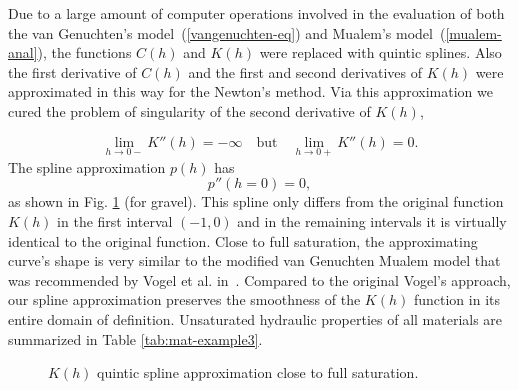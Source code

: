 \documentclass[final,3p,times,twocolumn]{elsarticle}
\begin{document}
Due to a large amount of computer operations involved in the evaluation of both 
the van Genuchten's model~(\ref{vangenuchten-eq}) and Mualem's model~(\ref{mualem-anal}), 
the functions $C(h)$ and $K(h)$ were replaced with quintic splines. Also the first derivative
of $C(h)$ and the first and second derivatives of $K(h)$ were approximated in this way 
for the Newton's method.
Via this approximation we cured the problem of singularity of the second derivative 
of $K(h)$, 

$$
  \lim_{h \to 0-} K''(h) = -\infty \quad \mbox{but} \quad \lim_{h \to 0+} K''(h) = 0. 
$$ 
The spline approximation $p(h)$ has 
$$
  p''(h=0) = 0,
$$
as shown in Fig. \ref{fig:kh-approx} (for gravel).
This spline only differs from the original function $K(h)$ in the first interval 
$(-1, 0)$ and in the remaining intervals it is virtually identical to the 
original function. Close to full saturation, the approximating curve's shape is 
very similar to the modified van Genuchten Mualem model that was recommended by Vogel et al. 
in~\cite{vogel}. Compared to the original Vogel's approach, our spline approximation 
preserves the smoothness of the $K(h)$ function in its entire domain of definition.
Unsaturated hydraulic properties of all materials are summarized in Table \ref{tab:mat-example3}.

\begin{figure}[htb!]
    \begin{center} 
    \end{center}
        \caption{$K(h)$ quintic spline approximation close to full saturation. }
      \label{fig:kh-approx}
\end{figure}
\end{document}
